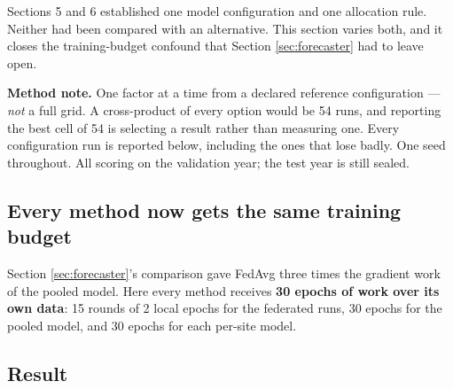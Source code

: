 \documentclass[11pt,a4paper]{article}
\newcommand{\keypoint}[1]{%
  \par\vspace{0.4em}%
  \noindent\colorbox{fed!8}{\parbox{0.98\textwidth}{\vspace{0.2em}#1\vspace{0.2em}}}%
  \par\vspace{0.4em}}
\begin{document}
Sections 5 and 6 established one model configuration and one allocation rule. Neither had been
compared with an alternative. This section varies both, and it closes the training-budget confound
that Section \ref{sec:forecaster} had to leave open.

\keypoint{\textbf{Method note.} One factor at a time from a declared reference configuration ---
\emph{not} a full grid. A cross-product of every option would be 54 runs, and reporting the best cell
of 54 is selecting a result rather than measuring one. Every configuration run is reported below,
including the ones that lose badly. One seed throughout. All scoring on the validation year; the test
year is still sealed.}

\subsection{Every method now gets the same training budget}

Section \ref{sec:forecaster}'s comparison gave FedAvg three times the gradient work of the pooled model. Here every method
receives \textbf{30 epochs of work over its own data}: 15 rounds of 2 local epochs for the federated
runs, 30 epochs for the pooled model, and 30 epochs for each per-site model.

\subsection{Result}
\end{document}

